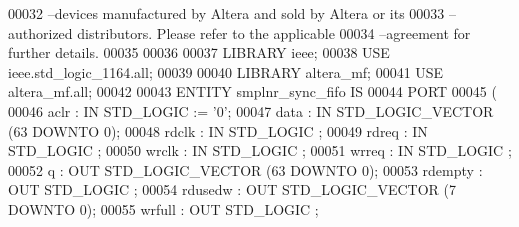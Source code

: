 \begin{DoxyCode}
{00032 \textcolor{keyword}{--devices manufactured by Altera and sold by Altera or its }
00033 \textcolor{keyword}{--authorized distributors.  Please refer to the applicable }
00034 \textcolor{keyword}{--agreement for further details.}
00035 
00036 
00037 \textcolor{vhdlkeyword}{LIBRARY }\textcolor{keywordflow}{ieee};
00038 \textcolor{vhdlkeyword}{USE }ieee.std\_logic\_1164.\textcolor{keywordflow}{all};
00039 
00040 \textcolor{vhdlkeyword}{LIBRARY }\textcolor{keywordflow}{altera\_mf};
00041 \textcolor{vhdlkeyword}{USE }\textcolor{keywordflow}{altera\_mf.all};
00042 
00043 \textcolor{keywordflow}{ENTITY }smplnr_sync_fifo \textcolor{keywordflow}{IS}
00044     \textcolor{keywordflow}{PORT}
00045     \textcolor{vhdlchar}{(}
00046         \textcolor{vhdlchar}{aclr}        \textcolor{vhdlchar}{:} \textcolor{keywordflow}{IN} \textcolor{comment}{STD\_LOGIC}  \textcolor{vhdlchar}{:=} \textcolor{vhdlchar}{'}\textcolor{vhdllogic}{}\textcolor{vhdllogic}{0}\textcolor{vhdlchar}{'};
00047         \textcolor{vhdlchar}{data}        \textcolor{vhdlchar}{:} \textcolor{keywordflow}{IN} \textcolor{comment}{STD\_LOGIC\_VECTOR} \textcolor{vhdlchar}{(}\textcolor{vhdllogic}{}\textcolor{vhdllogic}{63} \textcolor{keywordflow}{DOWNTO} \textcolor{vhdllogic}{}\textcolor{vhdllogic}{0}\textcolor{vhdlchar}{)};
00048         \textcolor{vhdlchar}{rdclk}       \textcolor{vhdlchar}{:} \textcolor{keywordflow}{IN} \textcolor{comment}{STD\_LOGIC} ;
00049         \textcolor{vhdlchar}{rdreq}       \textcolor{vhdlchar}{:} \textcolor{keywordflow}{IN} \textcolor{comment}{STD\_LOGIC} ;
00050         \textcolor{vhdlchar}{wrclk}       \textcolor{vhdlchar}{:} \textcolor{keywordflow}{IN} \textcolor{comment}{STD\_LOGIC} ;
00051         \textcolor{vhdlchar}{wrreq}       \textcolor{vhdlchar}{:} \textcolor{keywordflow}{IN} \textcolor{comment}{STD\_LOGIC} ;
00052         \textcolor{vhdlchar}{q}       \textcolor{vhdlchar}{:} \textcolor{keywordflow}{OUT} \textcolor{comment}{STD\_LOGIC\_VECTOR} \textcolor{vhdlchar}{(}\textcolor{vhdllogic}{}\textcolor{vhdllogic}{63} \textcolor{keywordflow}{DOWNTO} \textcolor{vhdllogic}{}\textcolor{vhdllogic}{0}\textcolor{vhdlchar}{)};
00053         \textcolor{vhdlchar}{rdempty}     \textcolor{vhdlchar}{:} \textcolor{keywordflow}{OUT} \textcolor{comment}{STD\_LOGIC} ;
00054         \textcolor{vhdlchar}{rdusedw}     \textcolor{vhdlchar}{:} \textcolor{keywordflow}{OUT} \textcolor{comment}{STD\_LOGIC\_VECTOR} \textcolor{vhdlchar}{(}\textcolor{vhdllogic}{}\textcolor{vhdllogic}{7} \textcolor{keywordflow}{DOWNTO} \textcolor{vhdllogic}{}\textcolor{vhdllogic}{0}\textcolor{vhdlchar}{)};
00055         \textcolor{vhdlchar}{wrfull}      \textcolor{vhdlchar}{:} \textcolor{keywordflow}{OUT} \textcolor{comment}{STD\_LOGIC} ;
}
\end{DoxyCode}
